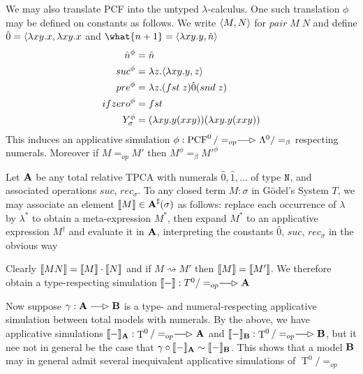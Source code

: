 \documentclass[11pt]{article}
\DeclareMathOperator{\PCF}{PCF}
\DeclareMathOperator{\tT}{T}
\begin{document}
\begin{examplle}[]
We may also translate PCF into the untyped \(\lambda\)-calculus. One such translation \(\phi\) may be defined on
constants as follows. We write \(\langle M,N\rangle\) for \(pair\;M\;N\) and
define \(\hat{0}=\langle\lambda xy.x,\lambda xy.x\) and \(\what{n+1}=\la\lambda xy.y,\hatn\ra\)
\begin{align*}
\hat{n}^\phi&=\hat{n}\\
suc^\phi&=\lambda z.\langle\lambda xy.y,z\rangle\\
pre^\phi&=\lambda z.(fst\;z)\hat{0}(snd\;z)\\
ifzero^\phi&=fst\\
Y_\sigma^\phi&=(\lambda xy.y(xxy))(\lambda xy.y(xxy))
\end{align*}
This induces an applicative simulation \(\phi:\PCF^0/=_{op}\lrarhd\Lambda^0/=_\beta\) respecting numerals.
Moreover if \(M=_{op}M'\) then \(M^\phi=_\beta M'^\phi\)
\end{examplle}

\begin{examplle}
Let \(\operatorname{\textbf{A}}\) be any total relative TPCA with numerals \(\hat{0},\hat{1},\dots\) of type \(\texttt{N}\), and
associated operations \(suc\), \(rec_\sigma\). To any closed term \(M:\sigma\) in Gödel's System \(T\), we
may associate an element \(\llbracket M \rrbracket\in\operatorname{\textbf{A}}^\sharp(\sigma)\) as follows: replace each occurrence of \(\lambda\) by \(\lambda^*\)
to obtain a meta-expression \(M^*\), then expand \(M^*\) to an applicative expression \(M^\dag\)
and evaluate it in \(\operatorname{\textbf{A}}\), interpreting the constants \(\hat{0}\), \(suc\), \(rec_\sigma\) in the
obvious way

Clearly \(\llbracket MN \rrbracket=\llbracket M \rrbracket\cdot\llbracket N \rrbracket\) and if \(M\rightsquigarrow M'\) then \(\llbracket M \rrbracket=\llbracket M' \rrbracket\). We therefore
obtain a type-respecting simulation \(\llb{-}:T^0/=_{op}\lrarhd\bA\)

Now suppose \(\gamma:\bA\lrarhd\bB\) is a type- and numeral-respecting applicative simulation between
total models with numerals. By the above, we have applicative simulations
\(\llb{-}_{\bA}:\tT^0/=_{op}\lrarhd\bA\) and \(\llb{-}_{\bB}:\tT^0/=_{op}\lrarhd\bB\), but it nee not in
general be the case that \(\gamma\circ\llbracket - \rrbracket_{\operatorname{\textbf{A}}}\sim\llbracket - \rrbracket_{\operatorname{\textbf{B}}}\). This shows that a model \(\operatorname{\textbf{B}}\) may in
general admit several inequivalent applicative simulations of \(\tT^0/=_{op}\)
\end{examplle}
\end{document}
